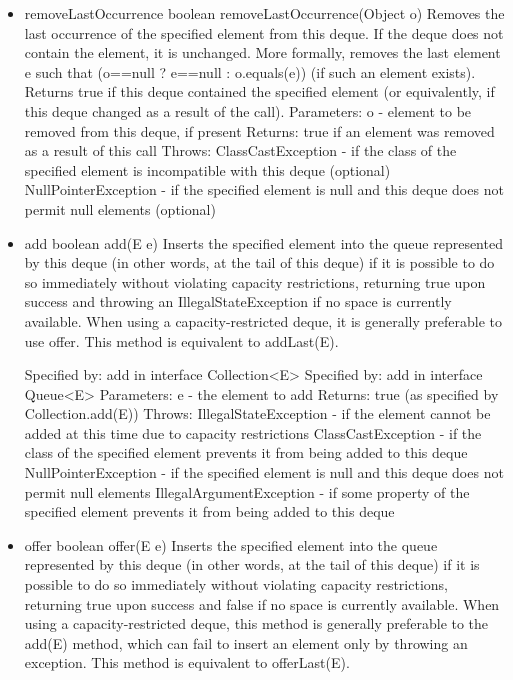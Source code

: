 \documentclass[babel]{book}
\begin{document}
\begin{itemize}
	\item removeLastOccurrence
	boolean removeLastOccurrence(Object o)
	Removes the last occurrence of the specified element from this deque. If the deque does not contain the element, it is unchanged. More formally, removes the last element e such that (o==null ? e==null : o.equals(e)) (if such an element exists). Returns true if this deque contained the specified element (or equivalently, if this deque changed as a result of the call).
	Parameters:
	o - element to be removed from this deque, if present
	Returns:
	true if an element was removed as a result of this call
	Throws:
	ClassCastException - if the class of the specified element is incompatible with this deque (optional)
	NullPointerException - if the specified element is null and this deque does not permit null elements (optional)
	
	\item add
	boolean add(E e)
	Inserts the specified element into the queue represented by this deque (in other words, at the tail of this deque) if it is possible to do so immediately without violating capacity restrictions, returning true upon success and throwing an IllegalStateException if no space is currently available. When using a capacity-restricted deque, it is generally preferable to use offer.
	This method is equivalent to addLast(E).
	
	Specified by:
	add in interface Collection<E>
	Specified by:
	add in interface Queue<E>
	Parameters:
	e - the element to add
	Returns:
	true (as specified by Collection.add(E))
	Throws:
	IllegalStateException - if the element cannot be added at this time due to capacity restrictions
	ClassCastException - if the class of the specified element prevents it from being added to this deque
	NullPointerException - if the specified element is null and this deque does not permit null elements
	IllegalArgumentException - if some property of the specified element prevents it from being added to this deque
	
	\item offer
	boolean offer(E e)
	Inserts the specified element into the queue represented by this deque (in other words, at the tail of this deque) if it is possible to do so immediately without violating capacity restrictions, returning true upon success and false if no space is currently available. When using a capacity-restricted deque, this method is generally preferable to the add(E) method, which can fail to insert an element only by throwing an exception.
	This method is equivalent to offerLast(E).
	

\end{itemize}
\end{document}
